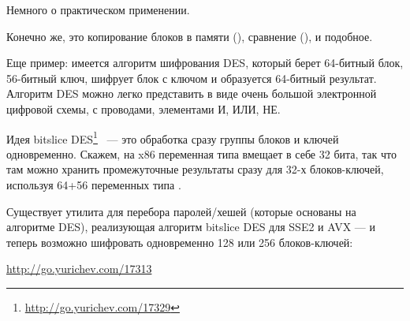 Немного о практическом применении.

Конечно же, это копирование блоков в памяти (), сравнение (), и подобное.

Еще пример: имеется алгоритм шифрования DES, который берет 64-битный блок, 56-битный ключ, 
шифрует блок с ключом и образуется 64-битный результат.
Алгоритм DES можно легко представить в виде очень большой электронной цифровой схемы, 
с проводами, элементами И, ИЛИ, НЕ.

\label{bitslicedes}
\newcommand{\URLBS}{\url{http://go.yurichev.com/17329}}

Идея bitslice DES\footnote{\URLBS} ~--- это обработка сразу группы блоков и ключей одновременно. 
Скажем, на x86 переменная типа  вмещает в себе 32 бита, так что там можно хранить 
промежуточные результаты сразу для 32-х блоков-ключей, используя 64+56 переменных типа .

\myindex{\oracle}
Существует утилита для перебора паролей/хешей \oracle (которые основаны на алгоритме DES), 
реализующая алгоритм bitslice DES для SSE2 и AVX --- и теперь возможно шифровать одновременно 
128 или 256 блоков-ключей:

\url{http://go.yurichev.com/17313}




